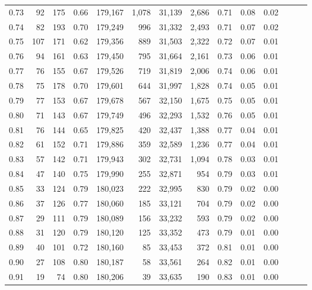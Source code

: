 \begin{tabular}{rrrrrrrrrrrrrr}
0.73 &      92 &  175 &  0.66 &  179,167 &    1,078 &  31,139 &   2,686 &  0.71 &  0.08 &      0.02 \\
0.74 &      82 &  193 &  0.70 &  179,249 &      996 &  31,332 &   2,493 &  0.71 &  0.07 &      0.02 \\
0.75 &     107 &  171 &  0.62 &  179,356 &      889 &  31,503 &   2,322 &  0.72 &  0.07 &      0.01 \\
0.76 &      94 &  161 &  0.63 &  179,450 &      795 &  31,664 &   2,161 &  0.73 &  0.06 &      0.01 \\
0.77 &      76 &  155 &  0.67 &  179,526 &      719 &  31,819 &   2,006 &  0.74 &  0.06 &      0.01 \\
0.78 &      75 &  178 &  0.70 &  179,601 &      644 &  31,997 &   1,828 &  0.74 &  0.05 &      0.01 \\
0.79 &      77 &  153 &  0.67 &  179,678 &      567 &  32,150 &   1,675 &  0.75 &  0.05 &      0.01 \\
0.80 &      71 &  143 &  0.67 &  179,749 &      496 &  32,293 &   1,532 &  0.76 &  0.05 &      0.01 \\
0.81 &      76 &  144 &  0.65 &  179,825 &      420 &  32,437 &   1,388 &  0.77 &  0.04 &      0.01 \\
0.82 &      61 &  152 &  0.71 &  179,886 &      359 &  32,589 &   1,236 &  0.77 &  0.04 &      0.01 \\
0.83 &      57 &  142 &  0.71 &  179,943 &      302 &  32,731 &   1,094 &  0.78 &  0.03 &      0.01 \\
0.84 &      47 &  140 &  0.75 &  179,990 &      255 &  32,871 &     954 &  0.79 &  0.03 &      0.01 \\
0.85 &      33 &  124 &  0.79 &  180,023 &      222 &  32,995 &     830 &  0.79 &  0.02 &      0.00 \\
0.86 &      37 &  126 &  0.77 &  180,060 &      185 &  33,121 &     704 &  0.79 &  0.02 &      0.00 \\
0.87 &      29 &  111 &  0.79 &  180,089 &      156 &  33,232 &     593 &  0.79 &  0.02 &      0.00 \\
0.88 &      31 &  120 &  0.79 &  180,120 &      125 &  33,352 &     473 &  0.79 &  0.01 &      0.00 \\
0.89 &      40 &  101 &  0.72 &  180,160 &       85 &  33,453 &     372 &  0.81 &  0.01 &      0.00 \\
0.90 &      27 &  108 &  0.80 &  180,187 &       58 &  33,561 &     264 &  0.82 &  0.01 &      0.00 \\
0.91 &      19 &   74 &  0.80 &  180,206 &       39 &  33,635 &     190 &  0.83 &  0.01 &      0.00 \\

\end{tabular}
